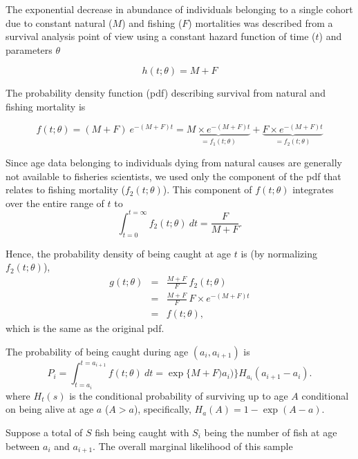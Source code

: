 The exponential decrease in abundance of individuals belonging to a single cohort due to constant natural ($M$) and fishing ($F$) mortalities was described from a survival analysis point of view \citep{cox84b} using a constant hazard function of time ($t$) and parameters $\theta$

\begin{equation}
h(t; \theta) = M + F
\end{equation}

The probability density function (pdf) describing survival from natural and fishing mortality is

\begin{equation}
f(t; \theta) = (M + F) \ e^{-(M+F)t} = \underbrace{M \times e^{-(M+F)t}}_{=f_{1}(t; \theta)} + \underbrace{F \times e^{-(M+F)t}}_{=f_{2}(t; \theta)}
\end{equation}

Since age data belonging to individuals dying from natural causes are generally not available to fisheries scientists, we used only the component of the pdf that relates to fishing mortality ($f_{2}(t; \theta)$). This component of $f(t; \theta)$ integrates over the entire range of $t$ to
\begin{equation}
\int_{t=0}^{t=\infty} f_{2}(t; \theta) \ dt  = \frac{F}{M+F}.
\end{equation}

Hence, the probability density of being caught at age $t$ is  (by normalizing $f_{2}(t; \theta)$),
\begin{eqnarray}
g(t; \theta) &=& \frac{M+F}{F} \ f_{2}(t; \theta) \\
             &=& \frac{M+F}{F} \ F \times e^{-(M+F)t} \\
             &=& f(t; \theta),
\end{eqnarray}
which is the same as the original pdf.

The probability of being caught during age $(a_i, a_{i+1})$ is
$$
P_i =   \int_{t=a_{i}}^{t=a_{i+1}} f(t; \theta) \ dt
   = \exp\{M+F)a_i)\} H_{a_i} (a_{i+1} -a_i).
$$
where $H_t(s)$ is the conditional probability of surviving up to age $A$ conditional on being alive at age $a$ ($A > a$), specifically, $H_a(A) =  1-\exp(A-a)$.




Suppose a total of $S$ fish being caught with $S_{i}$ being the number of fish at age between $a_i$ and $a_{i+1}$. The overall marginal likelihood of this sample

